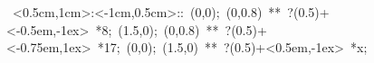 \hbox{
\xy    <0.5cm,1cm>:<-1cm,0.5cm>::
       (0,0); (0,0.8) **\dir{-}  ?(0.5)+<-0.5em,-1ex> *{8};
       (1.5,0); (0,0.8) **\dir{-}  ?(0.5)+<-0.75em,1ex> *{17};
       (0,0); (1.5,0) **\dir{-}    ?(0.5)+<0.5em,-1ex> *{x};
       \endxy}
